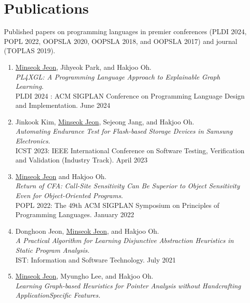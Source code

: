 \documentclass[letterpaper,11pt]{article}
\begin{document}
\section{Publications}
Published papers on programming languages in premier conferences
(PLDI 2024, POPL 2022, OOPSLA 2020, OOPSLA 2018, and OOPSLA 2017) and
journal (TOPLAS 2019). 
\begin{enumerate}
  \item {
    \underline{Minseok Jeon}, Jihyeok Park, and Hakjoo Oh.\\
    \textit{PL4XGL: A Programming Language Approach to Explainable Graph Learning.}\\
    PLDI 2024 : ACM SIGPLAN Conference on Programming Language Design and Implementation. June 2024
  }  
  \item {
    Jinkook Kim, \underline{Minseok Jeon}, Sejeong Jang, and Hakjoo Oh.\\
    \textit{Automating Endurance Test for Flash-based Storage Devices in Samsung Electronics.}\\
    ICST 2023: IEEE International Conference on Software Testing, Verification and Validation (Industry Track). April 2023
  }
  \item{
    \underline{Minseok Jeon} and Hakjoo Oh.\\
    \textit{Return of CFA: Call-Site Sensitivity Can Be Superior to Object Sensitivity Even for
    Object-Oriented Programs.}\\
    POPL 2022: The 49th ACM SIGPLAN Symposium on Principles of Programming Languages. January 2022
  }
  \item{
    Donghoon Jeon, \underline{Minseok Jeon}, and Hakjoo Oh.\\
    \textit{A Practical Algorithm for Learning Disjunctive Abstraction Heuristics in Static Program
    Analysis.}\\
    IST: Information and Software Technology. July 2021
  }
  \item{
    \underline{Minseok Jeon}, Myungho Lee, and Hakjoo Oh.\\
    \textit{Learning Graph-based Heuristics for Pointer Analysis without Handcrafting ApplicationSpecific Features.}\\
}
\end{enumerate}
\end{document}

